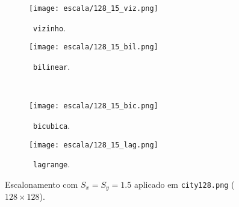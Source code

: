 \begin{figure}[H]
    \centering
    \begin{subfigure}{0.3\textwidth}
        \centering
        \texttt{[image: escala/128\_15\_viz.png]}
        \caption{~\texttt{vizinho}.}
    \end{subfigure}%
    \hspace{8pt}
    \begin{subfigure}{0.3\textwidth}
        \centering
        \texttt{[image: escala/128\_15\_bil.png]}
        \caption{~\texttt{bilinear}.}
        \label{fig:esc:15:bil}
    \end{subfigure}
    \\[8pt]
    \begin{subfigure}{0.3\textwidth}
        \centering
        \texttt{[image: escala/128\_15\_bic.png]}
        \caption{~\texttt{bicubica}.}
    \end{subfigure}%
    \hspace{8pt}%
    \begin{subfigure}{0.3\textwidth}
        \centering
        \texttt{[image: escala/128\_15\_lag.png]}
        \caption{~\texttt{lagrange}.}
    \end{subfigure}

    \caption{Escalonamento com $S_x = S_y = 1.5$ aplicado em \texttt{city128.png} ($128 \times 128$).}
    \label{fig:esc:15}
\end{figure}